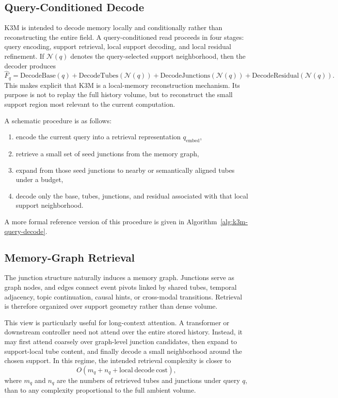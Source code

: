\documentclass[11pt]{article}
\begin{document}
\subsection{Query-Conditioned Decode}
K3M is intended to decode memory locally and conditionally rather than reconstructing the entire field. A query-conditioned read proceeds in four stages: query encoding, support retrieval, local support decoding, and local residual refinement. If $\mathcal{N}(q)$ denotes the query-selected support neighborhood, then the decoder produces
\begin{equation}
\hat F_q
=
\mathrm{DecodeBase}(q)
+
\mathrm{DecodeTubes}(\mathcal{N}(q))
+
\mathrm{DecodeJunctions}(\mathcal{N}(q))
+
\mathrm{DecodeResidual}(\mathcal{N}(q)).
\end{equation}
This makes explicit that K3M is a local-memory reconstruction mechanism. Its purpose is not to replay the full history volume, but to reconstruct the small support region most relevant to the current computation.

A schematic procedure is as follows:
\begin{enumerate}[leftmargin=1.5em]
\item encode the current query into a retrieval representation $q_{\mathrm{embed}}$,
\item retrieve a small set of seed junctions from the memory graph,
\item expand from those seed junctions to nearby or semantically aligned tubes under a budget,
\item decode only the base, tubes, junctions, and residual associated with that local support neighborhood.
\end{enumerate}
A more formal reference version of this procedure is given in Algorithm~\ref{alg:k3m-query-decode}.

\subsection{Memory-Graph Retrieval}
The junction structure naturally induces a memory graph. Junctions serve as graph nodes, and edges connect event pivots linked by shared tubes, temporal adjacency, topic continuation, causal hints, or cross-modal transitions. Retrieval is therefore organized over support geometry rather than dense volume.

This view is particularly useful for long-context attention. A transformer or downstream controller need not attend over the entire stored history. Instead, it may first attend coarsely over graph-level junction candidates, then expand to support-local tube content, and finally decode a small neighborhood around the chosen support. In this regime, the intended retrieval complexity is closer to
\begin{equation}
O(m_q + n_q + \mathrm{local\ decode\ cost}),
\end{equation}
where $m_q$ and $n_q$ are the numbers of retrieved tubes and junctions under query $q$, than to any complexity proportional to the full ambient volume.
\end{document}

